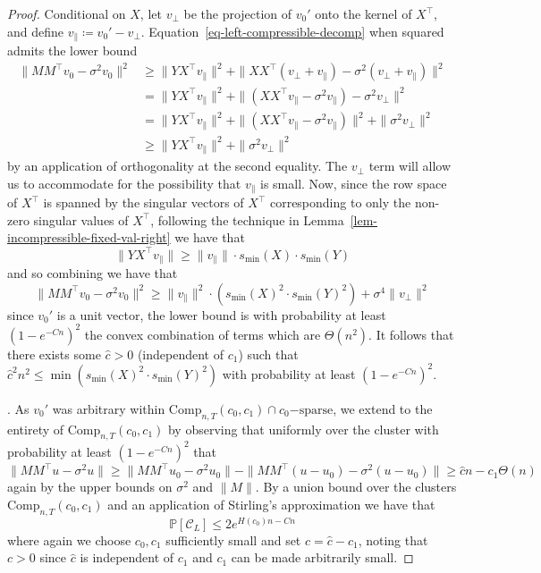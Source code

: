 \documentclass[10pt,a4paper]{amsart}
\newcommand{\Comp}{\mathrm{Comp}}
\newcommand{\MinSingVal}{s_{\mathrm{min}}}
\begin{document}
\begin{proof}
    Conditional on $X$, let $v_{\perp}$ be the projection of $v_0'$ onto the kernel of $X^\top $, and define $v_{\|} \coloneqq v_0' - v_{\perp}$. Equation~\ref{eq-left-compressible-decomp} when squared admits the lower bound
    \begin{align*}
        \| MM^\top v_0 - \sigma^2 v_0\|^2 &\geq \|YX^\top v_{\|}\|^2 + \|XX^\top (v_{\perp} + v_{\|}) - \sigma^2 (v_{\perp} + v_{\|})\|^2 \\
        &= \|YX^\top v_{\|}\|^2 + \|(XX^\top v_{\|} - \sigma^2 v_{\|})  - \sigma^2 v_{\perp}\|^2 \\
        &= \|YX^\top v_{\|}\|^2 + \|(XX^\top v_{\|} - \sigma^2 v_{\|})\|^2 + \|\sigma^2 v_{\perp}\|^2 \\
        &\geq \|YX^\top v_{\|}\|^2 + \|\sigma^2 v_{\perp}\|^2
    \end{align*}
    by an application of orthogonality at the second equality. The $v_{\perp}$ term will allow us to accommodate for the possibility that $v_{\|}$ is small. Now, since the row space of $X^\top $ is spanned by the singular vectors of $X^\top $ corresponding to only the non-zero singular values of $X^\top $, following the technique in Lemma~\ref{lem-incompressible-fixed-val-right} we have that
    \begin{equation*}
        \|YX^\top v_{\|}\| \geq \|v_{\|}\| \cdot \MinSingVal(X) \cdot \MinSingVal(Y)
    \end{equation*}
    and so combining we have that
    \begin{equation*}
        \| MM^\top v_0 - \sigma^2 v_0\|^2 \geq \|v_{\|}\|^2 \cdot (\MinSingVal(X)^2 \cdot \MinSingVal(Y)^2) + \sigma^4 \|v_{\perp}\|^2
    \end{equation*}
    since $v_0'$ is a unit vector, the lower bound is with probability at least $(1 - e^{-Cn})^2$ the convex combination of terms which are $\Theta(n^2)$. It follows that there exists some $\hat{c} > 0$ (independent of $c_1$) such that $\hat{c}^2 n^2 \leq \min(\MinSingVal(X)^2 \cdot \MinSingVal(Y)^2)$ with probability at least $(1 - e^{-Cn})^2$.
    
    . As $v_0'$ was arbitrary within $\Comp_{n, T}(c_0, c_1) \cap c_0\mathrm{-sparse}$, we extend to the entirety of $\Comp_{n, T}(c_0, c_1)$ by observing that uniformly over the cluster with probability at least $(1 - e^{-Cn})^2$ that
    \begin{equation*}
        \|MM^\top  u - \sigma^2 u\| \geq \|MM^\top  u_0 - \sigma^2 u_0\| - \|MM^\top  (u - u_0) - \sigma^2 (u - u_0)\| \geq \hat{c} n - c_1 \Theta(n)
    \end{equation*}
    again by the upper bounds on $\sigma^2$ and $\|M\|$. By a union bound over the clusters $\Comp_{n, T}(c_0, c_1)$ and an application of Stirling's approximation we have that
    \begin{equation*}
         \mathbb{P}[\mathcal{C}_L] \leq 2e^{H(c_0)n - Cn}
    \end{equation*}
    where again we choose $c_0, c_1$ sufficiently small and set $c = \hat{c} - c_1$, noting that $c > 0$ since $\hat{c}$ is independent of $c_1$ and $c_1$ can be made arbitrarily small.
\end{proof}
\end{document}
